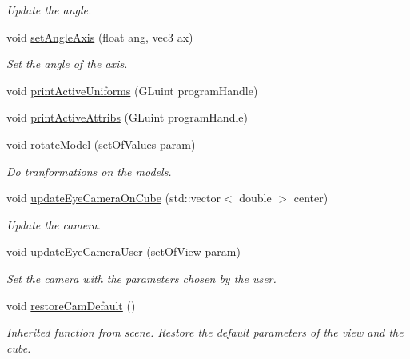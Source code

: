 \begin{DoxyCompactItemize}
\begin{DoxyCompactList}\small\item\em Update the angle. \end{DoxyCompactList}\item 
void \hyperlink{class_scene_basic_ae98490655b1c7cffe9ebeca001096b87}{set\+Angle\+Axis} (float ang, vec3 ax)
\begin{DoxyCompactList}\small\item\em Set the angle of the axis. \end{DoxyCompactList}\item 
void \hyperlink{class_scene_basic_abe43716a4f7a637850f725fcf14d4e5f}{print\+Active\+Uniforms} (G\+Luint program\+Handle)
\item 
void \hyperlink{class_scene_basic_a3a475225ffef7d3227401d762c7f2744}{print\+Active\+Attribs} (G\+Luint program\+Handle)
\item 
void \hyperlink{class_scene_basic_aa434179e3d31306f521f0d38c34baea3}{rotate\+Model} (\hyperlink{structset_of_values}{set\+Of\+Values} param)
\begin{DoxyCompactList}\small\item\em Do tranformations on the models. \end{DoxyCompactList}\item 
void \hyperlink{class_scene_basic_a3fa1c3ba519581687c7fe7214af8cc58}{update\+Eye\+Camera\+On\+Cube} (std\+::vector$<$ double $>$ center)
\begin{DoxyCompactList}\small\item\em Update the camera. \end{DoxyCompactList}\item 
void \hyperlink{class_scene_basic_abcd244d71f229f3d7c7133818c5e1898}{update\+Eye\+Camera\+User} (\hyperlink{structset_of_view}{set\+Of\+View} param)
\begin{DoxyCompactList}\small\item\em Set the camera with the parameters chosen by the user. \end{DoxyCompactList}\item 
void \hyperlink{class_scene_basic_ad7930ecd7654ac2c794ba666d71330e0}{restore\+Cam\+Default} ()
\begin{DoxyCompactList}\small\item\em Inherited function from scene. Restore the default parameters of the view and the cube. \end{DoxyCompactList}\end{DoxyCompactItemize}


